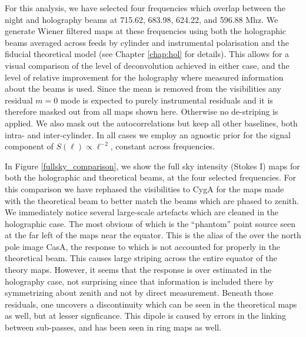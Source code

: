 For this analysis, we have selected four frequencies which overlap between the night and holography beams at 715.62, 683.98, 624.22, and 596.88 Mhz. We generate Wiener filtered maps at these frequencies using both the holographic beams averaged across feeds by cylinder and instrumental polarisation and the fiducial theoretical model (see Chapter \ref{chap:hol} for details). This allows for a visual comparison of the level of deconvolution achieved in either case, and the level of relative improvement for the holography where measured information about the beams is used. Since the mean is removed from the visibilities any residual $m=0$ mode is expected to purely instrumental residuals and it is therefore masked out from all maps shown here. Otherwise no de-striping is applied. We also mask out the autocorrelations but keep all other baselines, both intra- and inter-cylinder. In all cases we employ an agnostic prior for the signal component of $S(\ell) \propto \ell^{-2}$, constant across frequencies.

In Figure \ref{fullsky_comparison}, we show the full sky intensity (Stokes I) maps for both the holographic and theoretical beams, at the four selected frequencies.  For this comparison we have rephased the visibilities to CygA for the maps made with the theoretical beam to better match the beams which are phased to zenith. We immediately notice several large-scale artefacts which are cleaned in the holographic case. The most obvious of which is the ``phantom'' point source seen at the far left of the maps near the equator. This is the alias of the over the north pole image CasA, the response to which is not accounted for properly in the theoretical beam. This causes large striping across the entire equator of the theory maps. However, it seems that the response is over estimated in the holography case, not surprising since that information is included there by symmetrizing about zenith and not by direct measurement. Beneath those residuals, one uncovers a discontinuity which can be seen in the theoretical maps as well, but at lesser signficance. This dipole is caused by errors in the linking between sub-passes, and has been seen in ring maps as well. 

